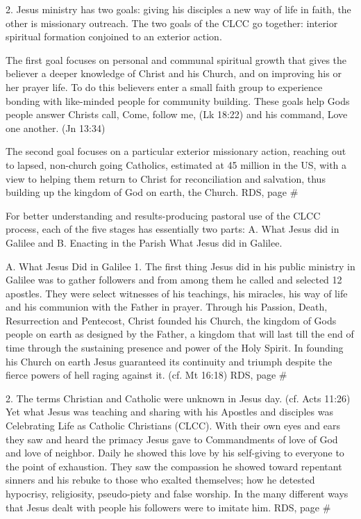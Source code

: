 \documentclass[oneside]{book}
\begin{document}
2. Jesus ministry has two goals: giving his disciples a new way of life in
faith, the other is missionary outreach. The two goals of the CLCC go together:
interior spiritual formation conjoined to an exterior action.

The first goal focuses on personal and communal spiritual growth that gives the
believer a deeper knowledge of Christ and his Church, and on improving his or
her prayer life. To do this believers enter a small faith group to experience
bonding with like-minded people for community building. These goals help Gods
people answer Christs call, Come, follow me, (Lk 18:22) and his command, Love
one another. (Jn 13:34)

The second goal focuses on a particular exterior missionary action, reaching out
to lapsed, non-church going Catholics, estimated at 45 million in the US, with a
view to helping them return to Christ for reconciliation and salvation, thus
building up the kingdom of God on earth, the Church.  RDS, page \#

For better understanding and results-producing pastoral use of the CLCC process,
each of the five stages has essentially two parts: A. What Jesus did in Galilee
and B. Enacting in the Parish What Jesus did in Galilee.

A. What Jesus Did in Galilee 1. The first thing Jesus did in his public ministry
in Galilee was to gather followers and from among them he called and selected 12
apostles. They were select witnesses of his teachings, his miracles, his way of
life and his communion with the Father in prayer. Through his Passion, Death,
Resurrection and Pentecost, Christ founded his Church, the kingdom of Gods
people on earth as designed by the Father, a kingdom that will last till the end
of time through the sustaining presence and power of the Holy Spirit. In
founding his Church on earth Jesus guaranteed its continuity and triumph despite
the fierce powers of hell raging against it. (cf. Mt 16:18) RDS, page \#

2. The terms Christian and Catholic were unknown in Jesus day. (cf. Acts 11:26)
Yet what Jesus was teaching and sharing with his Apostles and disciples was
Celebrating Life as Catholic Christians (CLCC). With their own eyes and ears
they saw and heard the primacy Jesus gave to Commandments of love of God and
love of neighbor. Daily he showed this love by his self-giving to everyone to
the point of exhaustion. They saw the compassion he showed toward repentant
sinners and his rebuke to those who exalted themselves; how he detested
hypocrisy, religiosity, pseudo-piety and false worship. In the many different
ways that Jesus dealt with people his followers were to imitate him.  RDS, page
\#
\end{document}
